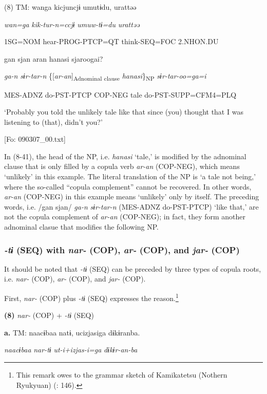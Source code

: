 (8)  TM:  wanga  kicjuncjɨ  umutɨdu,  urattəə

    \textit{wan=ga}  \textit{kik-tur-n=ccjɨ}  \textit{umuw-tɨ=du}  \textit{urattəə}

    1SG=NOM  hear-PROG-PTCP=QT  think-SEQ=FOC  2.NHON.DU

    gan  sjan  aran  hanasi  sjaroogai?

    \textit{ga-n}  \textit{sɨr-tar-n}  \{[\textit{ar-an}]\textsubscript{Adnominal clause}  \textit{hanasi}\}\textsubscript{NP}  \textit{sɨr-tar-oo=ga=i}

    MES-ADNZ  do-PST-PTCP  COP-NEG  tale  do-PST-SUPP=CFM4=PLQ

    ‘Probably you told the unlikely tale like that since (you) thought that I was listening to (that), didn’t you?’

    [Fo: 090307\_00.txt]

In (8-41), the head of the NP, i.e. \textit{hanasi} ‘tale,’ is modified by the adnominal clause that is only filled by a copula verb \textit{ar-an} (COP-NEG), which means ‘unlikely’ in this example. The literal translation of the NP is ‘a tale not being,’ where the so-called “copula complement” cannot be recovered. In other words, \textit{ar-an} (COP-NEG) in this example means ‘unlikely’ only by itself. The preceding words, i.e. /gan sjan/ \textit{ga-n} \textit{sɨr-tar-n} (MES-ADNZ do-PST-PTCP) ‘like that,’ are not the copula complement of \textit{ar-an} (COP-NEG); in fact, they form another adnominal clasue that modifies the following NP.

\subsubsection{\textit{{}-tɨ} (SEQ) with \textit{nar-} (COP), \textit{ar-} (COP), and \textit{jar-} (COP)}

It should be noted that \textit{{}-tɨ} (SEQ) can be preceded by three types of copula roots, i.e. \textit{nar-} (COP), \textit{ar-} (COP), and \textit{jar-} (COP).

First, \textit{nar-} (COP) plus \textit{{}-tɨ} (SEQ) expresses the reason.\footnote{This remark owes to the grammar sketch of Kamikatetsu (Nothern Ryukyuan) (\citealt{ShirataEtAl2011}: 146).}

\textbf{(8)}  \textit{nar-} (COP) + \textit{{}-tɨ} (SEQ)

  \textbf{a.}  TM:  naacɨbaa  natɨ,  ucizjasiga  dɨkɨranba.

      \textit{naacɨbaa}  \textit{nar-tɨ}  \textit{ut-i+izjas-i=ga}  \textit{dɨkɨr-an-ba}

